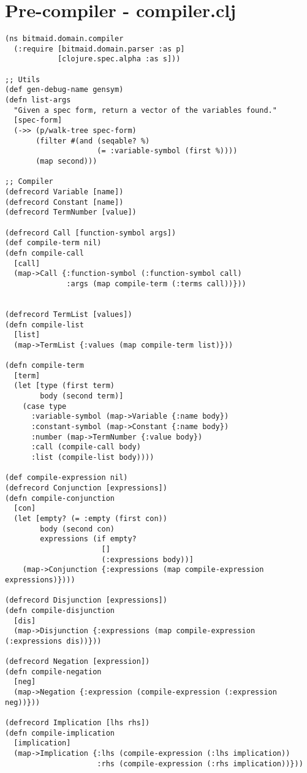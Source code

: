 \section{Pre-compiler - compiler.clj}
\begin{lstlisting}
(ns bitmaid.domain.compiler
  (:require [bitmaid.domain.parser :as p]
            [clojure.spec.alpha :as s]))

;; Utils
(def gen-debug-name gensym)
(defn list-args
  "Given a spec form, return a vector of the variables found."
  [spec-form]
  (->> (p/walk-tree spec-form)
       (filter #(and (seqable? %)
                     (= :variable-symbol (first %))))
       (map second)))

;; Compiler
(defrecord Variable [name])
(defrecord Constant [name])
(defrecord TermNumber [value])

(defrecord Call [function-symbol args])
(def compile-term nil)
(defn compile-call
  [call]
  (map->Call {:function-symbol (:function-symbol call)
              :args (map compile-term (:terms call))}))


(defrecord TermList [values])
(defn compile-list
  [list]
  (map->TermList {:values (map compile-term list)}))

(defn compile-term
  [term]
  (let [type (first term)
        body (second term)]
    (case type
      :variable-symbol (map->Variable {:name body})
      :constant-symbol (map->Constant {:name body})
      :number (map->TermNumber {:value body})
      :call (compile-call body)
      :list (compile-list body))))

(def compile-expression nil)
(defrecord Conjunction [expressions])
(defn compile-conjunction
  [con]
  (let [empty? (= :empty (first con))
        body (second con)
        expressions (if empty?
                      []
                      (:expressions body))]
    (map->Conjunction {:expressions (map compile-expression expressions)})))

(defrecord Disjunction [expressions])
(defn compile-disjunction
  [dis]
  (map->Disjunction {:expressions (map compile-expression (:expressions dis))}))

(defrecord Negation [expression])
(defn compile-negation
  [neg]
  (map->Negation {:expression (compile-expression (:expression neg))}))

(defrecord Implication [lhs rhs])
(defn compile-implication
  [implication]
  (map->Implication {:lhs (compile-expression (:lhs implication))
                     :rhs (compile-expression (:rhs implication))}))


\end{lstlisting}
